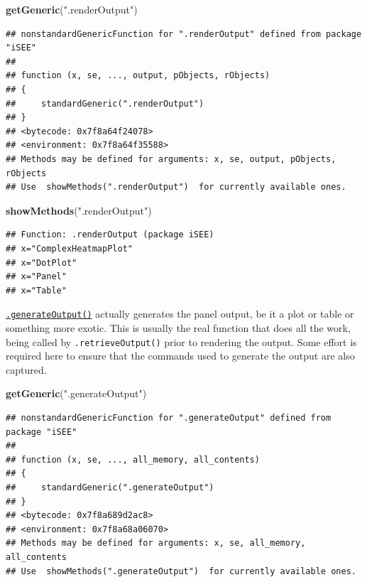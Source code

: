 \documentclass[
]{book}
\newenvironment{Shaded}{\begin{snugshade}}{\end{snugshade}}
\newcommand{\KeywordTok}[1]{\textcolor[rgb]{0.13,0.29,0.53}{\textbf{#1}}}
\newcommand{\NormalTok}[1]{#1}
\newcommand{\StringTok}[1]{\textcolor[rgb]{0.31,0.60,0.02}{#1}}
\begin{document}
\begin{Shaded}
\begin{Highlighting}[]
\KeywordTok{getGeneric}\NormalTok{(}\StringTok{".renderOutput"}\NormalTok{)}
\end{Highlighting}
\end{Shaded}

\begin{verbatim}
## nonstandardGenericFunction for ".renderOutput" defined from package "iSEE"
## 
## function (x, se, ..., output, pObjects, rObjects) 
## {
##     standardGeneric(".renderOutput")
## }
## <bytecode: 0x7f8a64f24078>
## <environment: 0x7f8a64f35588>
## Methods may be defined for arguments: x, se, output, pObjects, rObjects
## Use  showMethods(".renderOutput")  for currently available ones.
\end{verbatim}

\begin{Shaded}
\begin{Highlighting}[]
\KeywordTok{showMethods}\NormalTok{(}\StringTok{".renderOutput"}\NormalTok{)}
\end{Highlighting}
\end{Shaded}

\begin{verbatim}
## Function: .renderOutput (package iSEE)
## x="ComplexHeatmapPlot"
## x="DotPlot"
## x="Panel"
## x="Table"
\end{verbatim}

\href{https://isee.github.io/iSEE/reference/output-generics.html}{\texttt{.generateOutput()}} actually generates the panel output, be it a plot or table or something more exotic.
This is usually the real function that does all the work, being called by \texttt{.retrieveOutput()} prior to rendering the output.
Some effort is required here to ensure that the commands used to generate the output are also captured.

\begin{Shaded}
\begin{Highlighting}[]
\KeywordTok{getGeneric}\NormalTok{(}\StringTok{".generateOutput"}\NormalTok{)}
\end{Highlighting}
\end{Shaded}

\begin{verbatim}
## nonstandardGenericFunction for ".generateOutput" defined from package "iSEE"
## 
## function (x, se, ..., all_memory, all_contents) 
## {
##     standardGeneric(".generateOutput")
## }
## <bytecode: 0x7f8a689d2ac8>
## <environment: 0x7f8a68a06070>
## Methods may be defined for arguments: x, se, all_memory, all_contents
## Use  showMethods(".generateOutput")  for currently available ones.
\end{verbatim}
\end{document}
